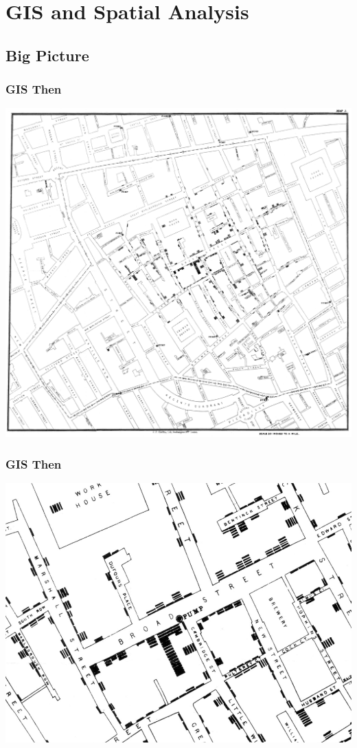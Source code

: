\documentclass[nototal,handout]{beamer}
\begin{document}
\section{GIS and Spatial Analysis} 

\subsection{Big Picture} 

\begin{frame}
	\frametitle{GIS Then}
 \begin{center}
 \includegraphics[width=.85\linewidth]{snowmap1.pdf}
  \end{center}
 \end{frame} 

\begin{frame}
	\frametitle{GIS Then}
 \begin{center}
 \includegraphics[width=.85\linewidth]{snowmap3.png}
  \end{center}
 \end{frame} 
\end{document}

